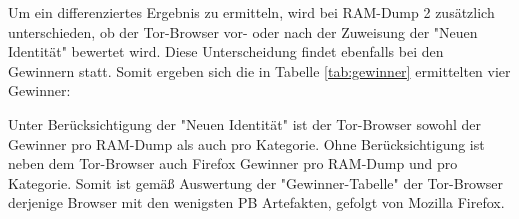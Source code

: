 Um ein differenziertes Ergebnis zu ermitteln, wird bei RAM-Dump 2 zusätzlich unterschieden, ob der Tor-Browser vor- oder nach der Zuweisung der "Neuen Identität" bewertet wird. 
Diese Unterscheidung findet ebenfalls bei den Gewinnern statt. Somit ergeben sich die in Tabelle \ref{tab:gewinner} ermittelten vier Gewinner:

\begin{table}[h!]
	\centering
	\label{tab:gewinner}
	\caption{Ermittelte Gewinner gemäß "Gewinner-Tabelle"}
\end{table}

Unter Berücksichtigung der "Neuen Identität" ist der Tor-Browser sowohl der Gewinner pro RAM-Dump als auch pro Kategorie.
Ohne Berücksichtigung ist neben dem Tor-Browser auch Firefox Gewinner pro RAM-Dump und pro Kategorie. Somit ist gemäß Auswertung der "Gewinner-Tabelle" der Tor-Browser derjenige Browser mit den wenigsten PB Artefakten, gefolgt von Mozilla Firefox.



















